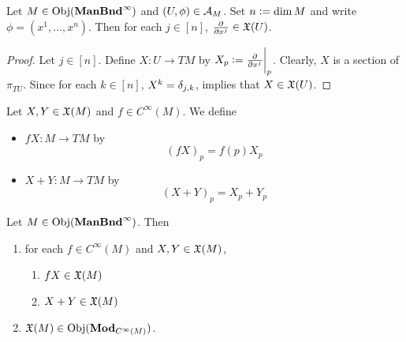 \documentclass{book}
\begin{document}
\begin{ex}
	Let $M \in \operatorname{Obj}(\operatorname*{\text{\textbf{ManBnd}}^{\infty}})$ and $(U, \phi) \in \mathcal{A}_M$. Set $n \vcentcolon= \dim M$ and write $\phi = (x^1, \ldots, x^n)$. Then for each $j \in [n]$, $\frac{\partial}{\partial x^j} \in \mathfrak{X}(U)$.
\end{ex}

\begin{proof}
	Let $j \in [n]$. Define $X:U \rightarrow TM$ by $X_p \vcentcolon= \frac{\partial}{\partial x^j} \bigg|_p$. Clearly, $X$ is a section of $\pi_{TU}$. Since for each $k \in [n]$, $X^k = \delta_{j,k}$,  implies that $X \in \mathfrak{X}(U)$. 
\end{proof}

\begin{defn}
	Let $X,Y \in \mathfrak{X}(M)$ and $f \in C^{\infty}(M)$. We define 
	\begin{itemize}
		\item $fX : M \rightarrow TM$ by $$(fX)_p = f(p)X_p$$
		\item $X+Y : M \rightarrow TM$ by $$(X+Y)_p = X_p+Y_p$$
	\end{itemize}
\end{defn}

\begin{ex} 
	Let $M \in \operatorname{Obj}(\operatorname*{\text{\textbf{ManBnd}}^{\infty}})$. Then
	\begin{enumerate}
		\item for each $f \in C^{\infty}(M)$ and $X,Y \in \mathfrak{X}(M)$, 
		\begin{enumerate}
			\item $fX \in \mathfrak{X}(M)$
			\item $X+Y \in \mathfrak{X}(M)$
		\end{enumerate}
		\item $\mathfrak{X}(M) \in \operatorname{Obj}(\operatorname*{\text{\textbf{Mod}}}_{C^{\infty}(M)})$.
	\end{enumerate}
\end{ex}
\end{document}
